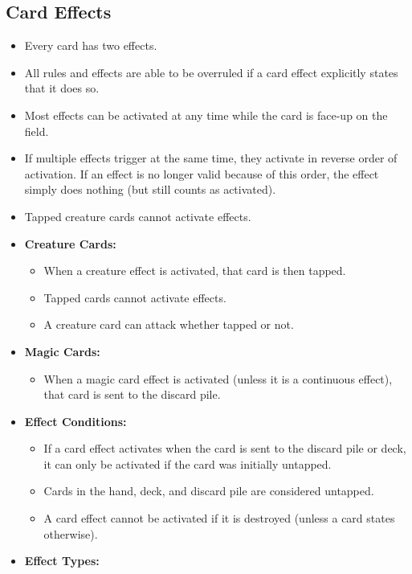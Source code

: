 \subsection{Card Effects}
\begin{itemize}
    \item Every card has two effects.
    \item All rules and effects are able to be overruled if a card effect explicitly states that it does so.
    \item Most effects can be activated at any time while the card is face-up on the field.
    \item If multiple effects trigger at the same time, they activate in reverse order of activation. If an effect is no longer valid because of this order, the effect simply does nothing (but still counts as activated).
    \item Tapped creature cards cannot activate effects.
    \item \textbf{Creature Cards:}
    \begin{itemize}
        \item When a creature effect is activated, that card is then tapped.
        \item Tapped cards cannot activate effects.
        \item A creature card can attack whether tapped or not.
    \end{itemize}
    \item \textbf{Magic Cards:}
    \begin{itemize}
        \item When a magic card effect is activated (unless it is a continuous effect), that card is sent to the discard pile.
    \end{itemize}
    \item \textbf{Effect Conditions:}
    \begin{itemize}
        \item If a card effect activates when the card is sent to the discard pile or deck, it can only be activated if the card was initially untapped.
        \item Cards in the hand, deck, and discard pile are considered untapped.
        \item A card effect cannot be activated if it is destroyed (unless a card states otherwise).
    \end{itemize}
    \item \textbf{Effect Types:}
    \begin{itemize}

\end{itemize}
\end{itemize}
